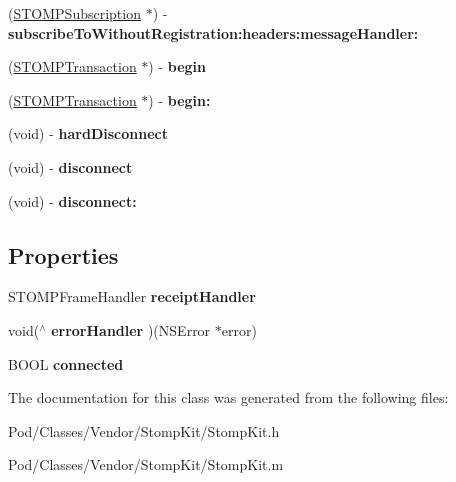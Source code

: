 \begin{DoxyCompactItemize}
\item 
(\hyperlink{interface_s_t_o_m_p_subscription}{S\+T\+O\+M\+P\+Subscription} $\ast$) -\/ {\bfseries subscribe\+To\+Without\+Registration\+:headers\+:message\+Handler\+:}\hypertarget{interface_s_t_o_m_p_client_abaaad977750225439886d558d2b1c0fb}{}\label{interface_s_t_o_m_p_client_abaaad977750225439886d558d2b1c0fb}

\item 
(\hyperlink{interface_s_t_o_m_p_transaction}{S\+T\+O\+M\+P\+Transaction} $\ast$) -\/ {\bfseries begin}\hypertarget{interface_s_t_o_m_p_client_a8b8811a169d05614e5abac4f503bd378}{}\label{interface_s_t_o_m_p_client_a8b8811a169d05614e5abac4f503bd378}

\item 
(\hyperlink{interface_s_t_o_m_p_transaction}{S\+T\+O\+M\+P\+Transaction} $\ast$) -\/ {\bfseries begin\+:}\hypertarget{interface_s_t_o_m_p_client_a451f417d7d5f3106394ac66a559bb02b}{}\label{interface_s_t_o_m_p_client_a451f417d7d5f3106394ac66a559bb02b}

\item 
(void) -\/ {\bfseries hard\+Disconnect}\hypertarget{interface_s_t_o_m_p_client_a1d7a740465fa50fe121a04b8063ee485}{}\label{interface_s_t_o_m_p_client_a1d7a740465fa50fe121a04b8063ee485}

\item 
(void) -\/ {\bfseries disconnect}\hypertarget{interface_s_t_o_m_p_client_a10fd8e1b3ba61ca1cdbb90eef51c42ef}{}\label{interface_s_t_o_m_p_client_a10fd8e1b3ba61ca1cdbb90eef51c42ef}

\item 
(void) -\/ {\bfseries disconnect\+:}\hypertarget{interface_s_t_o_m_p_client_a63bbe3bf9651425fd62079e2cd4cbecd}{}\label{interface_s_t_o_m_p_client_a63bbe3bf9651425fd62079e2cd4cbecd}

\end{DoxyCompactItemize}
\subsection*{Properties}
\begin{DoxyCompactItemize}
\item 
S\+T\+O\+M\+P\+Frame\+Handler {\bfseries receipt\+Handler}\hypertarget{interface_s_t_o_m_p_client_a8099202d5c9d7fbcd430314d00f17015}{}\label{interface_s_t_o_m_p_client_a8099202d5c9d7fbcd430314d00f17015}

\item 
void($^\wedge$ {\bfseries error\+Handler} )(N\+S\+Error $\ast$error)\hypertarget{interface_s_t_o_m_p_client_aaad657c8a436b36effd7346bce55baef}{}\label{interface_s_t_o_m_p_client_aaad657c8a436b36effd7346bce55baef}

\item 
B\+O\+OL {\bfseries connected}\hypertarget{interface_s_t_o_m_p_client_a5205b74e2b6fde4c4a4a7feeaebcdfb6}{}\label{interface_s_t_o_m_p_client_a5205b74e2b6fde4c4a4a7feeaebcdfb6}

\end{DoxyCompactItemize}


The documentation for this class was generated from the following files\+:\begin{DoxyCompactItemize}
\item 
Pod/\+Classes/\+Vendor/\+Stomp\+Kit/Stomp\+Kit.\+h\item 
Pod/\+Classes/\+Vendor/\+Stomp\+Kit/Stomp\+Kit.\+m\end{DoxyCompactItemize}
